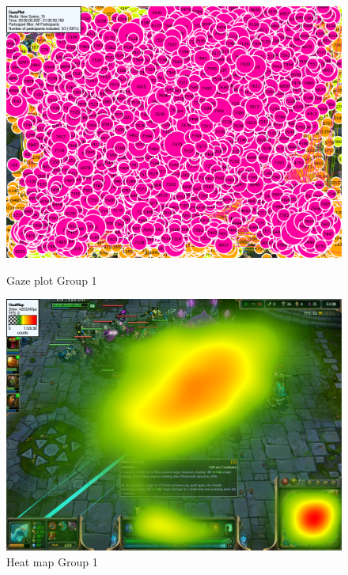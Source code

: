 \documentclass{report}
\begin{document}
\begin{figure}[ht]
\begin{minipage}[b]{0.45\linewidth}
\centering
\includegraphics[width=\textwidth]{images/gazeplot/Noobs}
\caption{Gaze plot Group 1}
\label{gaze_noob}
\end{minipage}
\hspace{0.5cm}
\begin{minipage}[b]{0.45\linewidth}
\centering
\includegraphics[width=\textwidth]{images/heatmap/Noobs}
\caption{Heat map Group 1}
\label{heat_noob}
\end{minipage}
\end{figure}
\end{document}
